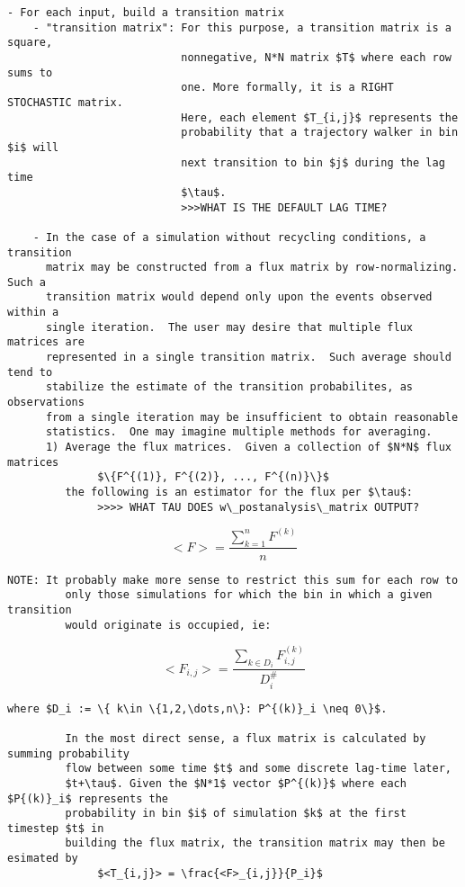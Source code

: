 \documentclass[10pt]{article}
\begin{document}
\begin{Verbatim}[commandchars=\\\{\},codes={\catcode`$=3\catcode`^=7\catcode`_=8}]
  - For each input, build a transition matrix 
    - "transition matrix": For this purpose, a transition matrix is a square,
                           nonnegative, N*N matrix $T$ where each row sums to 
                           one. More formally, it is a RIGHT STOCHASTIC matrix.  
                           Here, each element $T_{i,j}$ represents the 
                           probability that a trajectory walker in bin $i$ will
                           next transition to bin $j$ during the lag time 
                           $\tau$. 
                           >>>WHAT IS THE DEFAULT LAG TIME?

    - In the case of a simulation without recycling conditions, a transition
      matrix may be constructed from a flux matrix by row-normalizing. Such a
      transition matrix would depend only upon the events observed within a 
      single iteration.  The user may desire that multiple flux matrices are 
      represented in a single transition matrix.  Such average should tend to
      stabilize the estimate of the transition probabilites, as observations 
      from a single iteration may be insufficient to obtain reasonable
      statistics.  One may imagine multiple methods for averaging.
      1) Average the flux matrices.  Given a collection of $N*N$ flux matrices
              $\{F^{(1)}, F^{(2)}, ..., F^{(n)}\}$
         the following is an estimator for the flux per $\tau$:
              >>>> WHAT TAU DOES w\_postanalysis\_matrix OUTPUT?
\end{Verbatim}

              \[ <F> = \frac{\sum_{k=1}^{n} F^{(k)}}{n} \]

\begin{Verbatim}[commandchars=\\\{\},codes={\catcode`$=3\catcode`^=7\catcode`_=8}]
         NOTE: It probably make more sense to restrict this sum for each row to
         only those simulations for which the bin in which a given transition
         would originate is occupied, ie:
\end{Verbatim}

              \[ <F_{i,j}> = \frac{\sum_{k\in D_{i}} F^{(k)}_{i,j}}{D_{i}^\#} \]
        
\begin{Verbatim}[commandchars=\\\{\},codes={\catcode`$=3\catcode`^=7\catcode`_=8}]
         where $D_i := \{ k\in \{1,2,\dots,n\}: P^{(k)}_i \neq 0\}$.

         In the most direct sense, a flux matrix is calculated by summing probability 
         flow between some time $t$ and some discrete lag-time later, 
         $t+\tau$. Given the $N*1$ vector $P^{(k)}$ where each $P{(k)}_i$ represents the 
         probability in bin $i$ of simulation $k$ at the first timestep $t$ in 
         building the flux matrix, the transition matrix may then be esimated by 
              $<T_{i,j}> = \frac{<F>_{i,j}}{P_i}$
\end{Verbatim}
               
\end{document}
